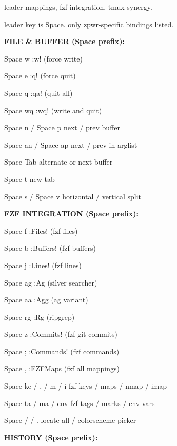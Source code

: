 \documentclass[11pt,a4paper,twoside]{book}
\begin{document}
leader mappings, fzf integration, tmux synergy.

leader key is Space. only zpwr-specific bindings listed.


\vspace{12pt}
{\bfseries\color{neonyellow} FILE \& BUFFER (Space prefix):}\vspace{4pt}

Space w               :w! (force write)

Space e               :q! (force quit)

Space q               :qa! (quit all)

Space wq              :wq! (write and quit)

Space n / Space p     next / prev buffer

Space an / Space ap   next / prev in arglist

Space Tab             alternate or next buffer

Space t               new tab

Space s / Space v     horizontal / vertical split


\vspace{12pt}
{\bfseries\color{neonyellow} FZF INTEGRATION (Space prefix):}\vspace{4pt}

Space f               :Files! (fzf files)

Space b               :Buffers! (fzf buffers)

Space j               :Lines! (fzf lines)

Space ag              :Ag (silver searcher)

Space aa              :Agg (ag variant)

Space rg              :Rg (ripgrep)

\begin{codebox}
Space z               :Commits! (fzf git commits)\\
\end{codebox}

Space ;               :Commands! (fzf commands)

Space ,               :FZFMaps (fzf all mappings)

Space ke / , / m / i  fzf keys / maps / nmap / imap

Space ta / ma / env  fzf tags / marks / env vars

Space / / .           locate all / colorscheme picker


\vspace{12pt}
{\bfseries\color{neonyellow} HISTORY (Space prefix):}\vspace{4pt}
\end{document}
